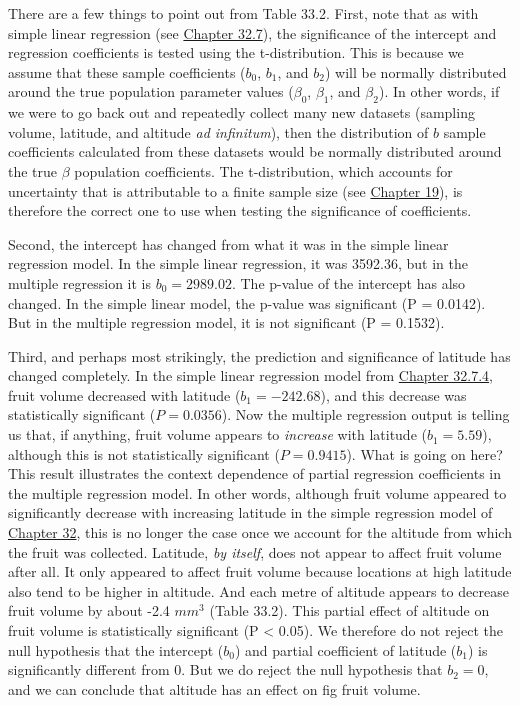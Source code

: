 \documentclass[
  openany]{krantz}
\begin{document}
There are a few things to point out from Table 33.2.
First, note that as with simple linear regression (see \protect\hyperlink{regression-hypothesis-testing}{Chapter 32.7}), the significance of the intercept and regression coefficients is tested using the t-distribution.
This is because we assume that these sample coefficients (\(b_{0}\), \(b_{1}\), and \(b_{2}\)) will be normally distributed around the true population parameter values (\(\beta_{0}\), \(\beta_{1}\), and \(\beta_{2}\)).
In other words, if we were to go back out and repeatedly collect many new datasets (sampling volume, latitude, and altitude \emph{ad infinitum}), then the distribution of \(b\) sample coefficients calculated from these datasets would be normally distributed around the true \(\beta\) population coefficients.
The t-distribution, which accounts for uncertainty that is attributable to a finite sample size (see \protect\hyperlink{Chapter_19}{Chapter 19}), is therefore the correct one to use when testing the significance of coefficients.

Second, the intercept has changed from what it was in the simple linear regression model.
In the simple linear regression, it was 3592.36, but in the multiple regression it is \(b_{0} = 2989.02\).
The p-value of the intercept has also changed.
In the simple linear model, the p-value was significant (P = 0.0142).
But in the multiple regression model, it is not significant (P = 0.1532).

Third, and perhaps most strikingly, the prediction and significance of latitude has changed completely.
In the simple linear regression model from \protect\hyperlink{simple-regression-output}{Chapter 32.7.4}, fruit volume decreased with latitude (\(b_{1} = -242.68\)), and this decrease was statistically significant (\(P = 0.0356\)).
Now the multiple regression output is telling us that, if anything, fruit volume appears to \emph{increase} with latitude (\(b_{1} = 5.59\)), although this is not statistically significant (\(P = 0.9415\)).
What is going on here?
This result illustrates the context dependence of partial regression coefficients in the multiple regression model.
In other words, although fruit volume appeared to significantly decrease with increasing latitude in the simple regression model of \protect\hyperlink{Chapter_32}{Chapter 32}, this is no longer the case once we account for the altitude from which the fruit was collected.
Latitude, \emph{by itself}, does not appear to affect fruit volume after all.
It only appeared to affect fruit volume because locations at high latitude also tend to be higher in altitude.
And each metre of altitude appears to decrease fruit volume by about -2.4 \(mm^{3}\) (Table 33.2).
This partial effect of altitude on fruit volume is statistically significant (P \textless{} 0.05).
We therefore do not reject the null hypothesis that the intercept (\(b_{0}\)) and partial coefficient of latitude (\(b_{1}\)) is significantly different from 0.
But we do reject the null hypothesis that \(b_{2} = 0\), and we can conclude that altitude has an effect on fig fruit volume.
\end{document}
